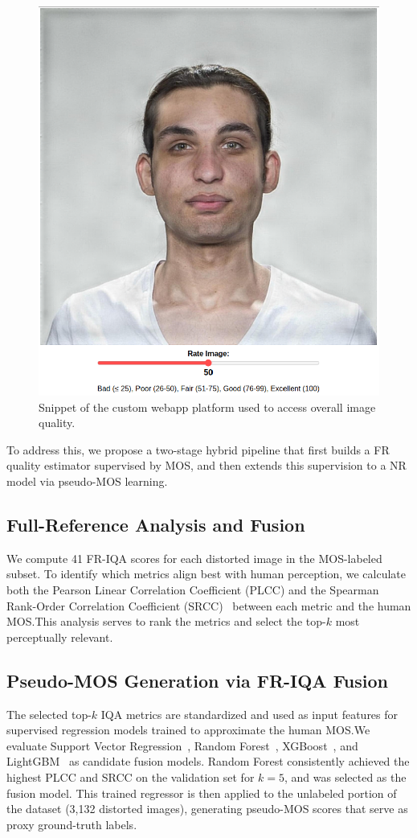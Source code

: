 \begin{figure}
    \centering
    \includegraphics[width=0.5\linewidth]{images/webapp.png}
    \caption{Snippet of the custom webapp platform used to access overall image quality.}\label{fig:platform}
\end{figure}

To address this, we propose a two-stage hybrid pipeline that first builds a FR quality estimator supervised by MOS, and then extends this supervision to a NR model via pseudo-MOS learning.

\subsection{Full-Reference Analysis and Fusion}

We compute 41 FR-IQA scores for each distorted image in the MOS-labeled subset. To identify which metrics align best with human perception, we calculate both the Pearson Linear Correlation Coefficient (PLCC) and the Spearman Rank-Order Correlation Coefficient (SRCC)~\cite{plcc_srcc} between each metric and the human MOS.\@ This analysis serves to rank the metrics and select the top-$k$ most perceptually relevant.

\subsection{Pseudo-MOS Generation via FR-IQA Fusion}

The selected top-$k$ IQA metrics are standardized and used as input features for supervised regression models trained to approximate the human MOS.\@ We evaluate Support Vector Regression~\cite{svr}, Random Forest~\cite{randomforest}, XGBoost~\cite{xgboost}, and LightGBM~\cite{lightgbm} as candidate fusion models. Random Forest consistently achieved the highest PLCC and SRCC on the validation set for $k=5$, and was selected as the fusion model. This trained regressor is then applied to the unlabeled portion of the dataset (3,132 distorted images), generating pseudo-MOS scores that serve as proxy ground-truth labels.

